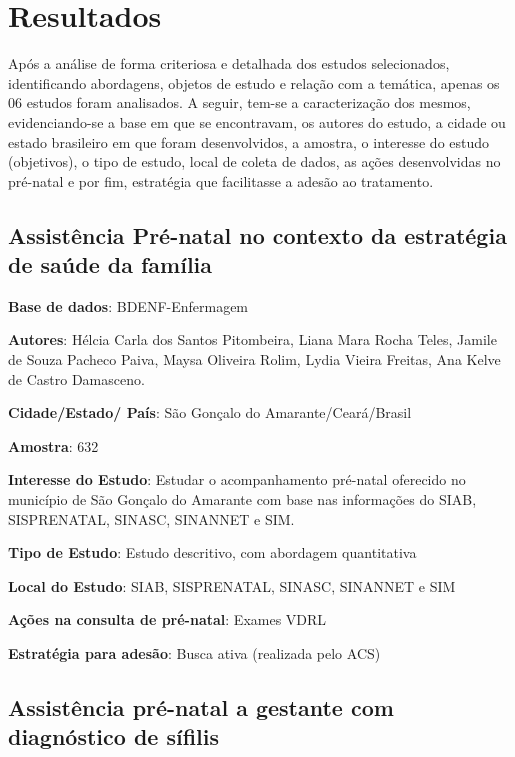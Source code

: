 \chapter{Resultados}
\label{chap:resultados}

Após a análise de forma criteriosa e detalhada dos estudos selecionados, identificando abordagens, objetos de estudo e relação com a temática, apenas os 06 estudos foram analisados. A seguir, tem-se a caracterização dos mesmos, evidenciando-se a base em que se encontravam, os autores do estudo, a cidade ou estado brasileiro em que foram desenvolvidos, a amostra, o interesse do estudo (objetivos), o tipo de estudo, local de coleta de dados, as ações desenvolvidas no pré-natal e por fim, estratégia que facilitasse a adesão ao tratamento.

\section{Assistência Pré-natal no contexto da estratégia de saúde da família \cite{dos2010assistencia}}

\begin{description}
\item \textbf{Base de dados}: BDENF-Enfermagem
\item \textbf{Autores}: Hélcia Carla dos Santos Pitombeira, Liana Mara Rocha Teles, Jamile de Souza Pacheco Paiva, Maysa Oliveira Rolim, Lydia Vieira Freitas, Ana Kelve de Castro Damasceno.
\item \textbf{Cidade/Estado/ País}: São Gonçalo do Amarante/Ceará/Brasil
\item \textbf{Amostra}: 632
\item \textbf{Interesse do Estudo}: Estudar o acompanhamento pré-natal oferecido no município de São Gonçalo do Amarante com base nas informações do SIAB, SISPRENATAL, SINASC, SINANNET e SIM.
\item \textbf{Tipo de Estudo}: Estudo descritivo, com abordagem quantitativa
\item \textbf{Local do Estudo}: SIAB, SISPRENATAL, SINASC, SINANNET e SIM
\item \textbf{Ações na consulta de pré-natal}: Exames VDRL
\item \textbf{Estratégia para adesão}: Busca ativa (realizada pelo ACS)
\end{description}

\section{Assistência pré-natal a gestante com diagnóstico de sífilis \cite{suto2016assistencia}}

